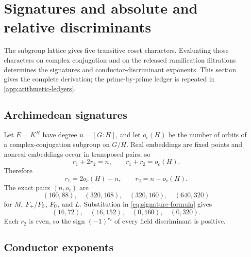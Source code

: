 \section{Signatures and absolute and relative discriminants}
\label{sec:global}

The subgroup lattice gives five transitive coset characters.  Evaluating
those characters on complex conjugation and on the released ramification
filtrations determines the signatures and conductor-discriminant exponents.
This section gives the complete derivation; the prime-by-prime ledger is
repeated in \cref{app:arithmetic-ledgers}.

\subsection{Archimedean signatures}

Let $E=K^H$ have degree $n=[G:H]$, and let $o_c(H)$ be the number of orbits
of a complex-conjugation subgroup on $G/H$.  Real embeddings are fixed
points and nonreal embeddings occur in transposed pairs, so
\[
 r_1+2r_2=n,\qquad r_1+r_2=o_c(H).
\]
Therefore
\begin{equation}
 r_1=2o_c(H)-n,\qquad r_2=n-o_c(H).
 \label{eq:signature-formula}
\end{equation}
The exact pairs $(n,o_c)$ are
\[
 (160,88),\quad(320,168),\quad(320,160),\quad(640,320)
\]
for $M$, $F_{+}/F_{3}$, $F_{0}$, and $L$.  Substitution in
\eqref{eq:signature-formula} gives
\begin{equation}
 (16,72),\quad(16,152),\quad(0,160),\quad(0,320).
 \label{eq:signatures}
\end{equation}
Each $r_2$ is even, so the sign $(-1)^{r_2}$ of every field discriminant is
positive.

\subsection{Conductor exponents}

